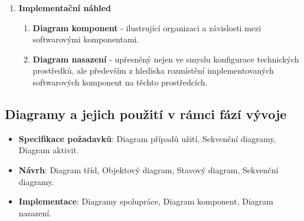 \begin{enumerate}
\begin{enumerate}
\begin{enumerate}
\end{enumerate}
\end{enumerate}
\item \textbf{Implementační náhled}
\begin{enumerate}
\item \textbf{Diagram komponent} - ilustrující organizaci a závislosti mezi softwarovými komponentami. 
\item \textbf{Diagram nasazení} - upřesněný nejen ve smyslu konfigurace technických prostředků, ale především z hlediska rozmístění implementovaných softwarových komponent na těchto prostředcích.
\end{enumerate}
\end{enumerate}

\subsection{Diagramy a jejich použití v rámci fází vývoje}
\begin{itemize}
\item \textbf{Specifikace požadavků}: Diagram případů užití, Sekvenční diagramy, Diagram aktivit.
\item \textbf{Návrh}: Diagram tříd, Objektový diagram, Stavový diagram, Sekvenční diagramy.
\item \textbf{Implementace}: Diagramy spolupráce, Diagram komponent, Diagram nasazení.
\end{itemize}
